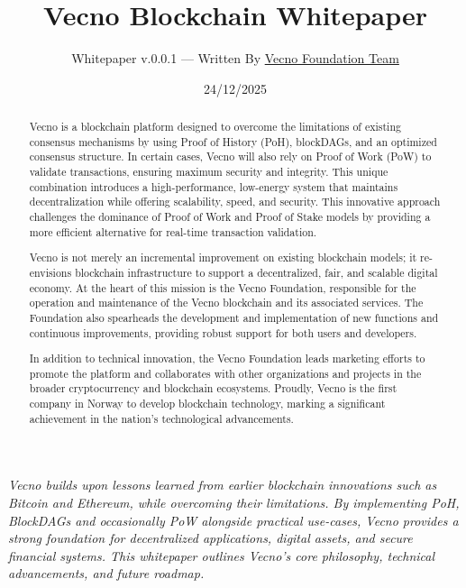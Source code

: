 \documentclass[a4paper,onecolumn,superscriptaddress,10pt]{compositionalityarticle}
\begin{document}
\title{Vecno Blockchain Whitepaper}
\date{24/12/2025}
\author{
    {\small Whitepaper v.0.0.1 --- Written By \small \href{https://github.com/Vecno-Foundation}{Vecno Foundation Team}}
}
\maketitle

\begin{abstract}
    Vecno is a blockchain platform designed to overcome the limitations of existing consensus mechanisms by using Proof of History (PoH), blockDAGs, and an optimized consensus structure. In certain cases, Vecno will also rely on Proof of Work (PoW) to validate transactions, ensuring maximum security and integrity. This unique combination introduces a high-performance, low-energy system that maintains decentralization while offering scalability, speed, and security. This innovative approach challenges the dominance of Proof of Work and Proof of Stake models by providing a more efficient alternative for real-time transaction validation.

    Vecno is not merely an incremental improvement on existing blockchain models; it re-envisions blockchain infrastructure to support a decentralized, fair, and scalable digital economy. At the heart of this mission is the Vecno Foundation, responsible for the operation and maintenance of the Vecno blockchain and its associated services. The Foundation also spearheads the development and implementation of new functions and continuous improvements, providing robust support for both users and developers.

    In addition to technical innovation, the Vecno Foundation leads marketing efforts to promote the platform and collaborates with other organizations and projects in the broader cryptocurrency and blockchain ecosystems. Proudly, Vecno is the first company in Norway to develop blockchain technology, marking a significant achievement in the nation's technological advancements.

\end{abstract}

\vspace{7cm}

\footnotesize{\textit{Vecno builds upon lessons learned from earlier blockchain innovations such as Bitcoin and Ethereum, while overcoming their limitations. By implementing PoH, BlockDAGs and occasionally PoW alongside practical use-cases, Vecno provides a strong foundation for decentralized applications, digital assets, and secure financial systems. This whitepaper outlines Vecno’s core philosophy, technical advancements, and future roadmap.}}
\end{document}
